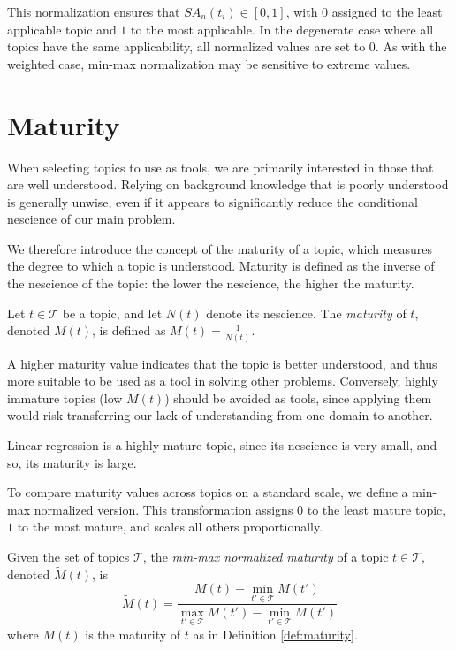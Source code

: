 This normalization ensures that $SA_n(t_i) \in [0,1]$, with $0$ assigned to the least applicable topic and $1$ to the most applicable. In the degenerate case where all topics have the same applicability, all normalized values are set to 0. As with the weighted case, min-max normalization may be sensitive to extreme values.

%
%

\section{Maturity}
\label{sec:intro_maturity}

When selecting topics to use as tools, we are primarily interested in those that are well understood. Relying on background knowledge that is poorly understood is generally unwise, even if it appears to significantly reduce the conditional nescience of our main problem.

We therefore introduce the concept of the maturity of a topic, which measures the degree to which a topic is understood. Maturity is defined as the inverse of the nescience of the topic: the lower the nescience, the higher the maturity.

\begin{definition}
\label{def:maturity}
Let $t \in \mathcal{T}$ be a topic, and let $N(t)$ denote its nescience.
The \emph{maturity} of $t$, denoted $M(t)$, is defined as $M(t) = \frac{1}{N(t)}$.
\end{definition}

A higher maturity value indicates that the topic is better understood, and thus more suitable to be used as a tool in solving other problems. Conversely, highly immature topics (low $M(t)$) should be avoided as tools, since applying them would risk transferring our lack of understanding from one domain to another.

\begin{example}
Linear regression is a highly mature topic, since its nescience is very small, and so, its maturity is large.
\end{example}

To compare maturity values across topics on a standard scale, we define a min-max normalized version. This transformation assigns $0$ to the least mature topic, $1$ to the most mature, and scales all others proportionally.

\begin{definition}
\label{def:normalized-maturity}
Given the set of topics $\mathcal{T}$, the \emph{min-max normalized maturity} of a topic $t \in \mathcal{T}$, denoted $\tilde{M}(t)$, is
\[
\tilde{M}(t) =
\frac{M(t) - \min_{t' \in \mathcal{T}} M(t')}
     {\max_{t' \in \mathcal{T}} M(t') - \min_{t' \in \mathcal{T}} M(t')}
\]
where $M(t)$ is the maturity of $t$ as in Definition \ref{def:maturity}.
\end{definition}

